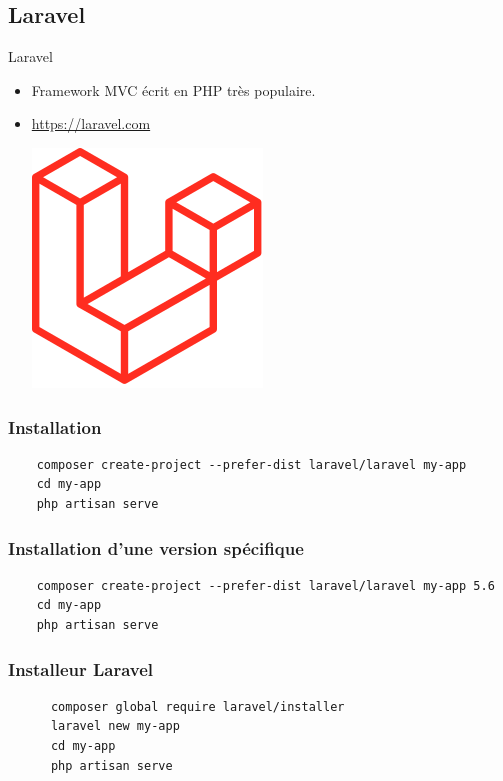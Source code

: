 \documentclass{beamer}
\begin{document}
\subsection{Laravel}
\begin{frame}{Laravel}
\begin{itemize}
  \item Framework MVC écrit en PHP très populaire.
  \item \url{https://laravel.com}
    \vspace{10pt}
    \begin{center}
      \includegraphics[scale=0.3]{images/laravel.png}
    \end{center}
\end{itemize}
\end{frame}

\begin{frame}[fragile]
\frametitle{Installation}
\begin{footnotesize}
  \begin{Verbatim}
    composer create-project --prefer-dist laravel/laravel my-app
    cd my-app
    php artisan serve
  \end{Verbatim}
\end{footnotesize}
\end{frame}

\begin{frame}[fragile]
\frametitle{Installation d'une version spécifique}
\begin{footnotesize}
  \begin{Verbatim}
    composer create-project --prefer-dist laravel/laravel my-app 5.6
    cd my-app
    php artisan serve
  \end{Verbatim}
\end{footnotesize}
\end{frame}

\begin{frame}[fragile]
  \frametitle{Installeur Laravel}
  \begin{footnotesize}
    \begin{Verbatim}
      composer global require laravel/installer
      laravel new my-app
      cd my-app
      php artisan serve
    \end{Verbatim}
  \end{footnotesize}
\end{frame}
\end{document}
